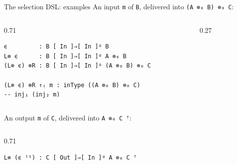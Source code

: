 \documentclass[aspectratio=169,10pt]{beamer}
\newcommand{\agda}[1]{\texttt{#1}}
\begin{document}
\begin{frame}[fragile]{The selection DSL: examples}
  \small An input \agda{m} of \agda{B}, delivered into
  \agda{(A ⊗₀ B) ⊗₀ C}:
  \begin{columns}[c]
    \begin{column}{0.71\textwidth}
\begin{verbatim}
ϵ         : B [ In ]⇒[ In ]ᵍ B
L⊗ ϵ      : B [ In ]⇒[ In ]ᵍ A ⊗₀ B
(L⊗ ϵ) ⊗R : B [ In ]⇒[ In ]ᵍ (A ⊗₀ B) ⊗₀ C

(L⊗ ϵ) ⊗R ↑ᵢ m : inType ((A ⊗₀ B) ⊗₀ C)
-- inj₁ (inj₂ m)
\end{verbatim}
    \end{column}
    \begin{column}{0.27\textwidth}
      \centering
    \end{column}
  \end{columns}
  \vspace{1mm}
  An output \agda{m} of \agda{C}, delivered into \agda{A ⊗₀ C ᵀ}:
  \begin{columns}[c]
    \begin{column}{0.71\textwidth}
\begin{verbatim}
L⊗ (ϵ ᵗ¹) : C [ Out ]⇒[ In ]ᵍ A ⊗₀ C ᵀ


\end{verbatim}
\end{column}
\end{columns}
\end{frame}
\end{document}
